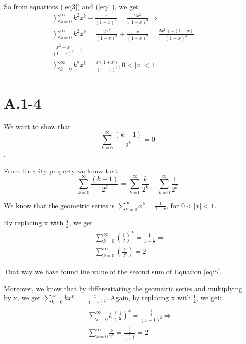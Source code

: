 \documentclass{article}
\begin{document}
So from equations (\ref{eq3}) and (\ref{eq4}), we get:
\begin{gather*}
    \sum_{k=0}^{\infty}{k^{2}x^{k}} - \frac{x}{(1 - x)^2} = \frac{2x^{2}}{(1-x)^{3}} \Rightarrow \\
    \sum_{k=0}^{\infty}{k^{2}x^{k}} = \frac{2x^{2}}{(1-x)^{3}} + \frac{x}{(1 - x)^2} = \frac{2x^{2} + x(1-x)}{(1-x)^{3}} = \\
    \frac{x^{2} + x}{(1-x)^{3}} \Rightarrow \\
    \sum_{k=0}^{\infty}{k^{2}x^{k}} = \frac{x(1+x)}{(1-x)^{3}}, 0 < |x| < 1
\end{gather*}

\section*{A.1-4}
We want to show that 
\begin{equation*}
    \sum_{k=0}^{\infty}{\frac{(k-1)}{2^{k}}} = 0
\end{equation*}.

From linearity property we know that 
\begin{equation} \label{eq:5}
    \sum_{k=0}^{\infty}{\frac{(k-1)}{2^{k}}} =    \sum_{k=0}^{\infty}{\frac{k}{2^{k}}} - \sum_{k=0}^{\infty}{\frac{1}{2^{k}}} 
\end{equation}

We know that the geometric series is $\sum_{k=0}^{\infty}{x^{k}} = \frac{1}{1 - x}$, for $0 < |x| < 1$.

By replacing x with $\frac{1}{2}$, we get 
\begin{gather*}
    \begin{align*}
        &\sum_{k=0}^{\infty}{(\frac{1}{2})^{k}} = \frac{1}{1 - \frac{1}{2}} \Rightarrow\\
        &\sum_{k=0}^{\infty}{(\frac{1}{2^{k}})} = 2
    \end{align*}
\end{gather*}

That way we have found the value of the second sum of Equation \ref{eq:5}.

Moreover, we know that by differentiating the geometric series and multiplying by x, we get $\sum_{k=0}^{\infty}{kx^{k}} = \frac{x}{(1 - x)^2}$. Again, by replacing x with $\frac{1}{2}$, we get:
\begin{gather*}
    \begin{align*}
        &\sum_{k=0}^{\infty}{k(\frac{1}{2})^{k}} = \frac{\frac{1}{2}}{(1 - \frac{1}{2})^2} \Rightarrow \\
        &\sum_{k=0}^{\infty}{\frac{k}{2^{k}}} = \frac{\frac{1}{2}}{(\frac{1}{4})} = 2
    \end{align*}
\end{gather*}
\end{document}
